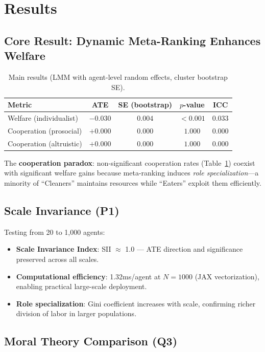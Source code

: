 \documentclass{article}
\begin{document}
\section{Results}

\subsection{Core Result: Dynamic Meta-Ranking Enhances Welfare}

\begin{table}[h]
\centering
\caption{Main results (LMM with agent-level random effects, cluster bootstrap SE).}
\label{tab:main}
\begin{tabular}{lcccc}
\toprule
Metric & ATE & SE (bootstrap) & $p$-value & ICC \\
\midrule
Welfare (individualist) & $-0.030$ & $0.004$ & $\mathbf{<0.001}$ & $0.033$ \\
Cooperation (prosocial) & $+0.000$ & $0.000$ & $1.000$ & $0.000$ \\
Cooperation (altruistic) & $+0.000$ & $0.000$ & $1.000$ & $0.000$ \\
\bottomrule
\end{tabular}
\end{table}

The \textbf{cooperation paradox}: non-significant cooperation rates (Table~\ref{tab:main}) coexist with significant welfare gains because meta-ranking induces \textit{role specialization}---a minority of ``Cleaners'' maintains resources while ``Eaters'' exploit them efficiently.

\subsection{Scale Invariance (P1)}

Testing from 20 to 1,000 agents:
\begin{itemize}
    \item \textbf{Scale Invariance Index}: SII $\approx$ 1.0 --- ATE direction and significance preserved across all scales.
    \item \textbf{Computational efficiency}: 1.32ms/agent at $N{=}1000$ (JAX vectorization), enabling practical large-scale deployment.
    \item \textbf{Role specialization}: Gini coefficient increases with scale, confirming richer division of labor in larger populations.
\end{itemize}

\subsection{Moral Theory Comparison (Q3)}
\end{document}

